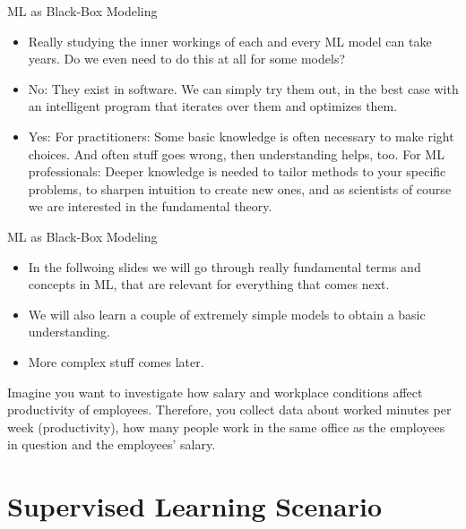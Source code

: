\begin{frame}{ML as Black-Box Modeling}

\begin{itemize}

\item
  Really studying the inner workings of each and every ML model can take
  years. Do we even need to do this at all for some models?
\item
  No: They exist in software. We can simply try them out, in the best
  case with an intelligent program that iterates over them and optimizes
  them.
\item
  Yes: For practitioners: Some basic knowledge is often necessary to make right choices.
  And often stuff goes wrong, then understanding helps, too.
  For ML professionals: Deeper knowledge is needed to tailor methods to your specific problems,
  to sharpen intuition to create new ones, and as scientists of course we are interested in
  the fundamental theory.
\end{itemize}

\end{frame}

\begin{frame}{ML as Black-Box Modeling}

\begin{itemize}
\item
  In the follwoing slides we will go through really fundamental terms
  and concepts in ML, that are relevant for everything that comes next.
\item
  We will also learn a couple of extremely simple models to obtain a
  basic understanding.
\item
  More complex stuff comes later.
\end{itemize}

Imagine you want to investigate how salary and workplace conditions
affect productivity of employees. Therefore, you collect data about
worked minutes per week (productivity), how many people work in the 
same office as the employees in question and the employees' salary.

\end{frame}


\section{Supervised Learning Scenario}

